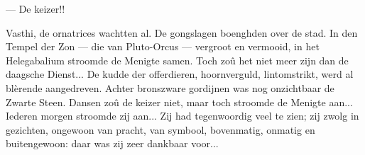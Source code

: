 \documentclass[a4paper, 12pt, oneside, dutch]{article}
\begin{document}
--- De keizer!!

Vasthi, de ornatrices wachtten al. De gongslagen boenghden over de stad. In den Tempel der Zon --- die van Pluto-Orcus --- vergroot en vermooid, in het Helegabalium stroomde de Menigte samen. Toch zoû het niet meer zijn dan de daagsche Dienst... De kudde der offerdieren, hoornverguld, lintomstrikt, werd al blèrende aangedreven. Achter bronszware gordijnen was nog onzichtbaar de Zwarte Steen. Dansen zoû de keizer niet, maar toch stroomde de Menigte aan... Iederen morgen stroomde zij aan... Zij had tegenwoordig veel te zien; zij zwolg in gezichten, ongewoon van pracht, van symbool, bovenmatig, onmatig en buitengewoon: daar was zij zeer dankbaar voor...

\subsection{}
\end{document}
